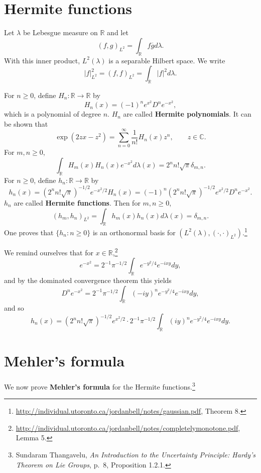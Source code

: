 \documentclass{article}
\theoremstyle{definition}
\begin{document}
\section{Hermite functions}
Let $\lambda$ be Lebesgue measure on $\mathbb{R}$ and let
\[
(f,g)_{L^2} = \int_{\mathbb{R}} f\overline{g} d\lambda.
\]
With this inner product, $L^2(\lambda)$ is a  separable Hilbert space. We write
\[
|f|_{L^2}^2 = (f,f)_{L^2} = \int_{\mathbb{R}} |f|^2 d\lambda.
\]


For $n \geq 0$, define $H_n:\mathbb{R} \to \mathbb{R}$ by
\[
H_n(x) = (-1)^n e^{x^2} D^n e^{-x^2},
\]
which is a polynomial of degree $n$. $H_n$ are called \textbf{Hermite
polynomials}.
It can be shown that
\begin{equation}
\exp(2zx-z^2)=\sum_{n=0}^\infty \frac{1}{n!} H_n(x) z^n,\qquad z \in \mathbb{C}.
\label{generating}
\end{equation}
For $m, n \geq 0$,
\[
\int_{\mathbb{R}} H_m(x) H_n(x) e^{-x^2} d\lambda(x) =2^n n! \sqrt{\pi}   \delta_{m,n}.
\]
For $n \geq 0$, define  $h_n:\mathbb{R} \to \mathbb{R}$ by
\[
h_n(x) = 
(2^n n! \sqrt{\pi})^{-1/2} e^{-x^2/2}H_n(x)=
(-1)^n (2^n n! \sqrt{\pi})^{-1/2} e^{x^2/2} D^n e^{-x^2}.
\]
$h_n$ are called \textbf{Hermite functions}.
Then for $m,n \geq 0$,
\[
(h_m,h_n)_{L^2} = \int_{\mathbb{R}} h_m(x) h_n(x) d\lambda(x) = \delta_{m,n}.
\]
One proves that $\{h_n: n \geq 0\}$ is an orthonormal basis for $(L^2(\lambda),(\cdot,\cdot)_{L^2})$.\footnote{\url{http://individual.utoronto.ca/jordanbell/notes/gaussian.pdf},
Theorem 8.}


We remind ourselves that for $x \in \mathbb{R}$,\footnote{\url{http://individual.utoronto.ca/jordanbell/notes/completelymonotone.pdf},
Lemma 5.}
\[
e^{-x^2} = 2^{-1} \pi^{-1/2} \int_{\mathbb{R}} e^{-y^2/4} e^{-i xy} dy,
\]
and by the dominated convergence theorem this yields
\[
D^n e^{-x^2} = 2^{-1} \pi^{-1/2} \int_{\mathbb{R}} (-iy)^n e^{-y^2/4} e^{-ixy} dy,
\]
and so
\begin{equation}
h_n(x) = (2^n n! \sqrt{\pi})^{-1/2} e^{x^2/2} \cdot  2^{-1} \pi^{-1/2}  \int_{\mathbb{R}} (iy)^n e^{-y^2/4} e^{-ixy} dy.
\label{gaussian}
\end{equation}


\section{Mehler's formula}
We now prove \textbf{Mehler's formula} for the Hermite functions.\footnote{Sundaram Thangavelu,
{\em An Introduction to the
Uncertainty Principle: Hardy's Theorem on Lie Groups}, p.~8, Proposition 1.2.1.}
\end{document}
